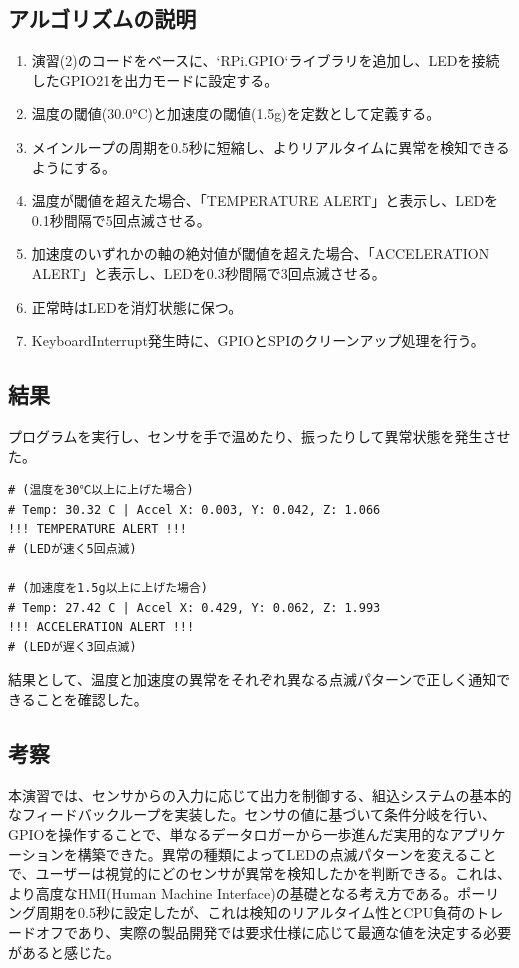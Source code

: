 \documentclass[a4paper,11pt,dvipdfmx]{jsarticle}
\begin{document}
\subsection{アルゴリズムの説明}
\begin{enumerate}
    \item 演習(2)のコードをベースに、`RPi.GPIO`ライブラリを追加し、LEDを接続したGPIO21を出力モードに設定する。
    \item 温度の閾値(30.0°C)と加速度の閾値(1.5g)を定数として定義する。
    \item メインループの周期を0.5秒に短縮し、よりリアルタイムに異常を検知できるようにする。
    \item 温度が閾値を超えた場合、「TEMPERATURE ALERT」と表示し、LEDを0.1秒間隔で5回点滅させる。
    \item 加速度のいずれかの軸の絶対値が閾値を超えた場合、「ACCELERATION ALERT」と表示し、LEDを0.3秒間隔で3回点滅させる。
    \item 正常時はLEDを消灯状態に保つ。
    \item KeyboardInterrupt発生時に、GPIOとSPIのクリーンアップ処理を行う。
\end{enumerate}

\subsection{結果}
プログラムを実行し、センサを手で温めたり、振ったりして異常状態を発生させた。
\begin{verbatim}
# (温度を30℃以上に上げた場合)
# Temp: 30.32 C | Accel X: 0.003, Y: 0.042, Z: 1.066
!!! TEMPERATURE ALERT !!!
# (LEDが速く5回点滅)

# (加速度を1.5g以上に上げた場合)
# Temp: 27.42 C | Accel X: 0.429, Y: 0.062, Z: 1.993
!!! ACCELERATION ALERT !!!
# (LEDが遅く3回点滅)
\end{verbatim}
結果として、温度と加速度の異常をそれぞれ異なる点滅パターンで正しく通知できることを確認した。

\subsection{考察}
本演習では、センサからの入力に応じて出力を制御する、組込システムの基本的なフィードバックループを実装した。センサの値に基づいて条件分岐を行い、GPIOを操作することで、単なるデータロガーから一歩進んだ実用的なアプリケーションを構築できた。異常の種類によってLEDの点滅パターンを変えることで、ユーザーは視覚的にどのセンサが異常を検知したかを判断できる。これは、より高度なHMI(Human Machine Interface)の基礎となる考え方である。ポーリング周期を0.5秒に設定したが、これは検知のリアルタイム性とCPU負荷のトレードオフであり、実際の製品開発では要求仕様に応じて最適な値を決定する必要があると感じた。
\end{document}
